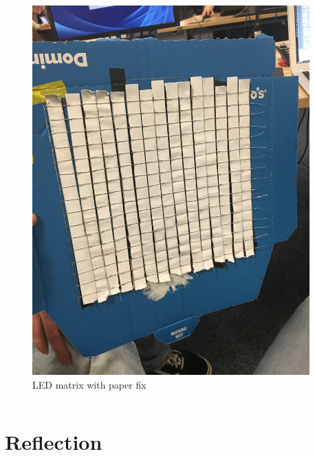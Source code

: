 \documentclass{beamer}
\begin{document}
\begin{frame}
\begin{columns}
\begin{column}{0.4\textwidth}
\begin{figure}
	\includegraphics[scale=0.032]{images/good_connections.jpg}
	\caption{LED matrix with paper fix}
\end{figure}
\end{column}

\begin{column}{0.05\textwidth}
\end{column}

\end{columns}

\end{frame}



\section{Reflection}
\end{document}
